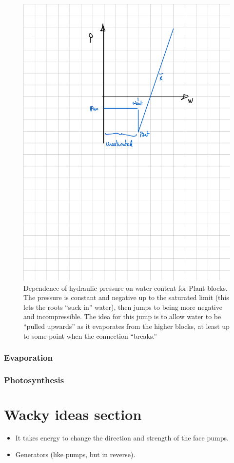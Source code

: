 \documentclass[10pt, a4paper, twocolumn]{article}
\begin{document}
\begin{figure}[ht]
  \centering
  \includegraphics{fig-plant-pressure.pdf}
  \caption{Dependence of hydraulic pressure on water content for Plant
    blocks. The pressure is constant and negative up to the saturated
    limit (this lets the roots ``suck in'' water), then jumps to being
    more negative and incompressible. The idea for this jump is to
    allow water to be ``pulled upwards'' as it evaporates from the
    higher blocks, at least up to some point when the connection
    ``breaks.''}
  \label{fig:plant-pressure}
\end{figure}

  
  
\subsubsection{Evaporation}

\subsubsection{Photosynthesis}

  




\section{Wacky ideas section}

\begin{itemize}
\item It takes energy to change the direction and strength of the face
  pumps. 
\item Generators (like pumps, but in reverse).
\end{itemize}
\end{document}
